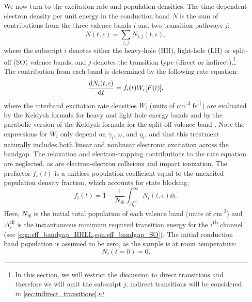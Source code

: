 We now turn to the excitation rate and population densities. The time-dependent electron density per unit energy in the conduction band $N$ is the sum of contributions from the three valence bands $i$ and two transition pathways $j$:
\begin{equation}
\label{eqn:Keldysh_sum}
N(t, \epsilon) = \sum_{i,j} N_{i,j}(t, \epsilon),
\end{equation}
where the subscript $i$ denotes either the heavy-hole (HH), light-hole (LH) or split-off (SO) valence bands, and $j$ denotes the transition type (direct or indirect).\footnote{In this section, we will restrict the discussion to direct transitions and therefore we will omit the subscript $j$; indirect transitions will be considered in \cref{sec:indirect_transitions}.} The contribution from each band is determined by the following rate equation:
\begin{equation}
\label{eqn:Keldysh_rate_eqn}
\dv{N_i(t, \epsilon)}{t} = f_i(t) W_i [F(t)],
\end{equation}
where the interband excitation rate densities $W_i$ (units of cm\textsuperscript{-3} fs\textsuperscript{-1}) are evaluated by the Keldysh formula for heavy and light hole energy bands \cite{keldyshIonizationFieldStrong1965} and by the parabolic version of the Keldysh formula for the split-off valence band \cite{gruzdevIonizationNanoparticlesSupershort2014}. Note the expressions for $W_i$ only depend on $\gamma_i$, $\omega$, and $\eta_i$, and that this treatment naturally includes both linear and nonlinear electronic excitation across the bandgap. The relaxation and electron-trapping contributions to the rate equation are neglected, as are electron-electron collisions and impact ionization. The prefactor $f_i(t)$ is a unitless population coefficient equal to the unexcited population density fraction, which accounts for state blocking:
\begin{equation}
f_i(t) = 1 - \frac{1}{N_{i0}} \int_{\Delta_i^{\textrm{eff}}}^{\infty} N_i(t,\epsilon) \dd{\epsilon}.
\end{equation}
Here, $N_{i0}$ is the initial total population of each valence band (units of cm\textsuperscript{-3}) and $\Delta_i^{\textrm{eff}}$ is the instantaneous minimum required transition energy for the $i$\textsuperscript{th} channel (see \cref{eqn:eff_bandgap_HHLL,eqn:eff_bandgap_SO}). The initial conduction band population is assumed to be zero, as the sample is at room temperature:
\begin{equation}
N_i(t=0)=0.
\end{equation}

